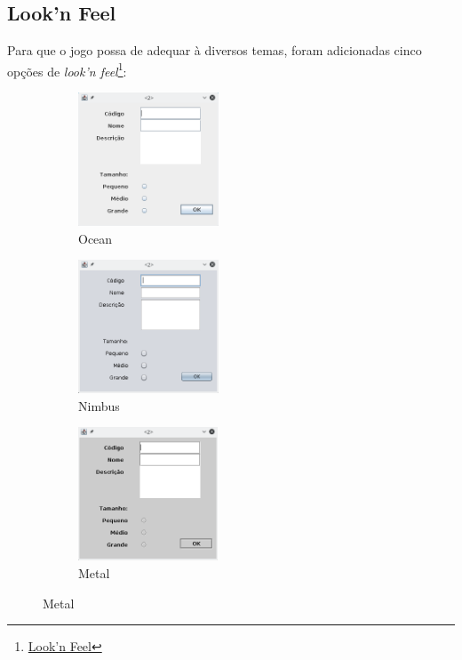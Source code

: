 \documentclass[11pt]{article}
\begin{document}
\subsection{Look'n Feel}
\label{sec:orgbfc4934}
Para que o jogo possa de adequar à diversos temas, foram adicionadas cinco opções de
\emph{look'n feel}\footnote{\href{https://pt.wikipedia.org/wiki/Look\_and\_Feel}{Look'n Feel}}:
\begin{figure}[h] \centering
\begin{subfigure}[t]{0.33\textwidth} \centering
\includegraphics[height=150px]{./img/ocean.png}
\captionsetup{labelformat=empty} \caption{Ocean}
\end{subfigure}
\begin{subfigure}[t]{0.33\textwidth} \centering
\includegraphics[height=150px]{./img/nimbus.png}
\captionsetup{labelformat=empty} \caption{Nimbus}
\end{subfigure}
\begin{subfigure}[t]{0.32\textwidth} \centering
\includegraphics[height=150px]{./img/metal.png}
\captionsetup{labelformat=empty} \caption{Metal}
\end{subfigure}
\end{figure}
\end{document}

